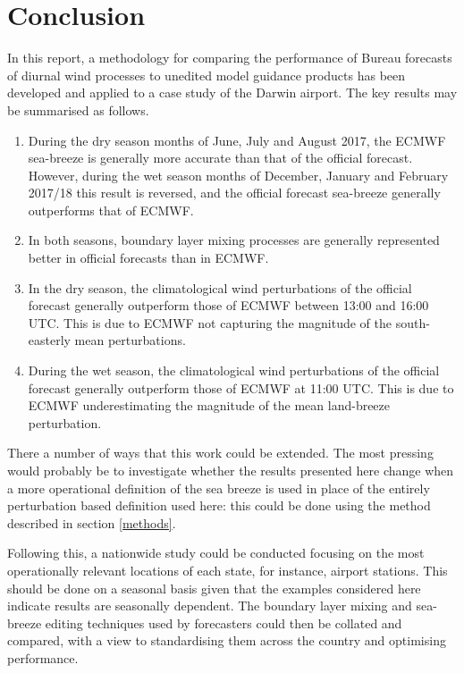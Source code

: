 \documentclass[12pt]{article}
\begin{document}
\section{Conclusion}
In this report, a methodology for comparing the performance of Bureau forecasts of diurnal wind processes to unedited model guidance products has been developed and applied to a case study of the Darwin airport. The key results may be summarised as follows.
\begin{enumerate}
\item
During the dry season months of June, July and August 2017, the ECMWF sea-breeze is generally more accurate than that of the official forecast. However, during the wet season months of December, January and February 2017/18 this result is reversed, and the official forecast sea-breeze generally outperforms that of ECMWF. 
\item
In both seasons, boundary layer mixing processes are generally represented better in official forecasts than in ECMWF.
\item
In the dry season, the climatological wind perturbations of the official forecast generally outperform those of ECMWF between 13:00 and 16:00 UTC. This is due to ECMWF not capturing the magnitude of the south-easterly mean perturbations. 
\item
During the wet season, the climatological wind perturbations of the official forecast generally outperform those of ECMWF at 11:00 UTC. This is due to ECMWF underestimating the magnitude of the mean land-breeze perturbation.
\end{enumerate}

There a number of ways that this work could be extended. The most pressing would probably be to investigate whether the results presented here change when a more operational definition of the sea breeze is used in place of the entirely perturbation based definition used here: this could be done using the method described in section \ref{methods}.

Following this, a nationwide study could be conducted focusing on the most operationally relevant locations of each state, for instance, airport stations. This should be done on a seasonal basis given that the examples considered here indicate results are seasonally dependent. The boundary layer mixing and sea-breeze editing techniques used by forecasters could then be collated and compared, with a view to standardising them across the country and optimising performance.



\end{document}
